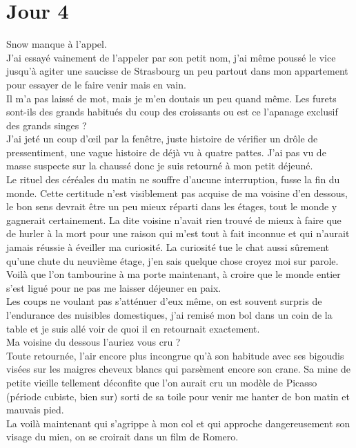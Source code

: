 \chapter*{Jour 4}
Snow manque à l'appel. \\

J'ai essayé vainement de l’appeler par son petit nom, j'ai même poussé le vice jusqu'à agiter une saucisse de Strasbourg un peu partout dans mon appartement pour essayer de le faire venir mais en vain. \\
Il m'a pas laissé de mot, mais je m'en doutais un peu quand même. Les furets sont-ils des grands habitués du coup des croissants ou est ce l'apanage exclusif des grands singes ? \\

J'ai jeté un coup d’œil par la fenêtre, juste histoire de vérifier un drôle de pressentiment, une vague histoire de déjà vu à quatre pattes. J'ai pas vu de masse suspecte sur la chaussé donc je suis retourné à mon petit déjeuné. \\
Le rituel des céréales du matin ne souffre d'aucune interruption, fusse la fin du monde. Cette certitude n'est visiblement pas acquise de ma voisine d'en dessous, le bon sens devrait être un peu mieux réparti dans les étages, tout le monde y gagnerait certainement. La dite voisine n'avait rien trouvé de mieux à faire que de hurler à la mort pour une raison qui m'est tout à fait inconnue et qui n'aurait jamais réussie à éveiller ma curiosité. La curiosité tue le chat aussi sûrement qu'une chute du neuvième étage, j'en sais quelque chose croyez moi sur parole. \\

Voilà que l'on tambourine à ma porte maintenant, à croire que le monde entier s'est ligué pour ne pas me laisser déjeuner en paix. \\

Les coups ne voulant pas s'atténuer d'eux même, on est souvent surpris de l'endurance des nuisibles domestiques, j'ai remisé mon bol dans un coin de la table et je suis allé voir de quoi il en retournait exactement. \\
Ma voisine du dessous l'auriez vous cru ? \\
Toute retournée, l'air encore plus incongrue qu'à son habitude avec ses bigoudis visées sur les maigres cheveux blancs qui parsèment encore son crane. Sa mine de petite vieille tellement déconfite que l'on aurait cru un modèle de Picasso (période cubiste, bien sur) sorti de sa toile pour venir me hanter de bon matin et mauvais pied. \\
La voilà maintenant qui s'agrippe à mon col et qui approche dangereusement son visage du mien, on se croirait dans un film de Romero.\\

